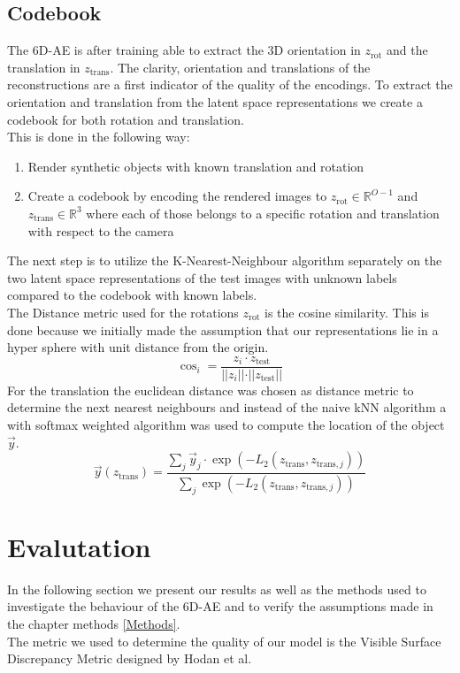 \documentclass[10pt,a4paper]{article}
\newcommand{\rot}{\ensuremath{\text{rot}\xspace}}
\newcommand{\trans}{\ensuremath{\text{trans}\xspace}}
\begin{document}
\subsection{Codebook}\label{Codebook}
The 6D-AE is after training able to extract the 3D orientation in $z_{\rot}$ and the translation in $z_{\trans}$. The clarity, orientation and translations of the reconstructions are a first indicator of the quality of the encodings. To extract the orientation and translation from the latent space representations we create a codebook for both rotation and translation.\\
This is done in the following way:
\begin{enumerate}
\item Render synthetic objects with known translation and rotation\\
\item Create a codebook by encoding the rendered images to $z_{\rot}\in \mathbb{R}^{O-1}$ and $z_{\trans} \in \mathbb{R}^3$ where each of those belongs to a specific rotation and translation with respect to the camera
\end{enumerate}
The next step is to utilize the K-Nearest-Neighbour algorithm separately on the two latent space representations of the test images with unknown labels compared to the codebook with known labels.\\
The Distance metric used for the rotations $z_{\rot}$ is the cosine similarity. This is done because we initially made the assumption that our representations lie in a hyper sphere with unit distance from the origin.
\begin{equation}
\cos_i = \dfrac{z_i \cdot z_{\text{test}}}{ \vert\vert  z_i \vert \vert \cdot \vert \vert z_{\text{test}} \vert \vert }
\end{equation}
For the translation the euclidean distance was chosen as distance metric to determine the next nearest neighbours and instead of the naive kNN algorithm a with softmax weighted algorithm was used to compute the location of the object $\vec{y}$. 
\begin{equation}
\vec{y}(z_{\trans}) = \dfrac{\sum_j  \vec{y}_j  \cdot  \exp(- L_2(z_{\trans},z_{\trans , j})) }{\sum_j \exp(- L_2(z_{\trans},z_{\trans , j}))}
\end{equation}


\newpage
\section{Evalutation}\label{Evaluation}
In the following section we present our results as well as the methods used to investigate the behaviour of the 6D-AE and to verify the assumptions made in the chapter methods \ref{Methods}.\\
The metric we used to determine the quality of our model is the Visible Surface Discrepancy Metric designed by Hodan et al. 
\end{document}
